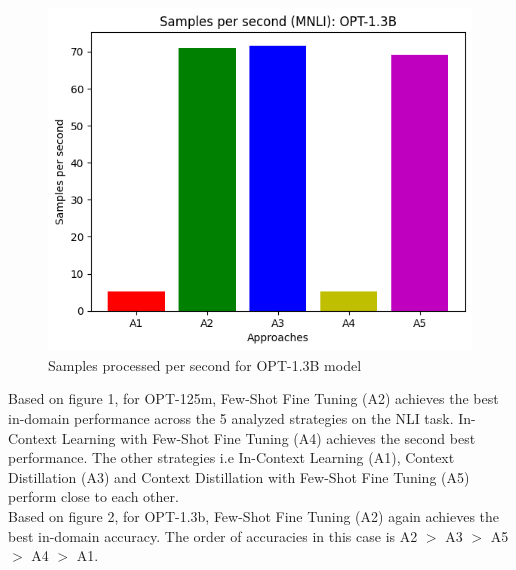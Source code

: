 \documentclass[10pt,twocolumn,letterpaper]{article}
\begin{document}
\begin{figure}[H]
\begin{center}
\includegraphics[width=0.8\linewidth]{figures/samples-opt1_3B.png}
\end{center}
\caption{Samples processed per second for OPT-1.3B model}
\end{figure}


Based on figure 1, for OPT-125m, Few-Shot Fine Tuning (A2) achieves the best in-domain performance across the 5 analyzed strategies on the NLI task. In-Context Learning with Few-Shot Fine Tuning (A4) achieves the second best performance. The other strategies i.e In-Context Learning (A1), Context Distillation (A3) and Context Distillation with Few-Shot Fine Tuning (A5) perform close to each other.\\

Based on figure 2, for OPT-1.3b, Few-Shot Fine Tuning (A2) again achieves the best in-domain accuracy. The order of accuracies in this case is A2 $>$ A3 $>$ A5 $>$ A4 $>$ A1.\\


\end{document}

